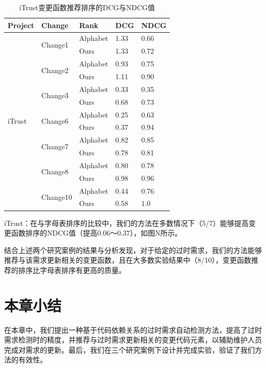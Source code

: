 \begin{table}[]
\centering
\caption{iTrust变更函数推荐排序的DCG与NDCG值}
\label{my-label}
\begin{tabular}{lllll}
\hline
Project                  & Change                   & Rank     & DCG  & NDCG \\ \hline
\multirow{14}{*}{iTrust} & \multirow{2}{*}{Change1} & Alphabet & 1.33 & 0.66 \\
                         &                          & Ours     & 1.33 & 0.72 \\
                         & \multirow{2}{*}{Change2} & Alphabet & 0.93 & 0.75 \\
                         &                          & Ours     & 1.11 & 0.90 \\
                         & \multirow{2}{*}{Change3} & Alphabet & 0.33 & 0.35 \\
                         &                          & Ours     & 0.68 & 0.73 \\
                         & \multirow{2}{*}{Change6} & Alphabet & 0.25 & 0.63 \\
                         &                          & Ours     & 0.37 & 0.94 \\
                         & \multirow{2}{*}{Change7} & Alphabet & 0.82 & 0.85 \\
                         &                          & Ours     & 0.78 & 0.81 \\
                         & \multirow{2}{*}{Change8} & Alphabet & 0.80 & 0.78 \\
                         &                          & Ours     & 0.98 & 0.96 \\
                         & \multirow{2}{*}{Change10} & Alphabet & 0.44 & 0.76 \\
                         &                          & Ours     & 0.58 & 1.0 \\ \hline
\end{tabular}
\end{table}

iTrust：在与字母表排序的比较中，我们的方法在多数情况下（5/7）能够提高变更函数排序的NDCG值（提高0.06～0.37），如图N所示。

结合上述两个研究案例的结果与分析发现，对于给定的过时需求，我们的方法能够推荐与该需求更新相关的变更函数，且在大多数实验结果中（8/10），变更函数推荐的排序比字母表排序有更高的质量。

\section{本章小结}

在本章中，我们提出一种基于代码依赖关系的过时需求自动检测方法，提高了过时需求检测时的精度，并推荐与过时需求更新相关的变更代码元素，以辅助维护人员完成对需求的更新。最后，我们在三个研究案例下设计并完成实验，验证了我们方法的有效性。
